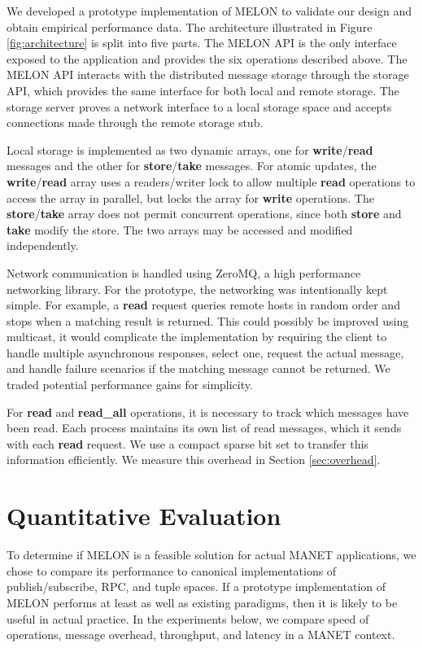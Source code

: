 \documentclass[lnicst]{svmultln}
\begin{document}
We developed a prototype implementation of MELON to validate our design and obtain empirical performance data. The architecture illustrated in Figure \ref{fig:architecture} is split into five parts. The MELON API is the only interface exposed to the application and provides the six operations described above. The MELON API interacts with the distributed message storage through the storage API, which provides the same interface for both local and remote storage. The storage server proves a network interface to a local storage space and accepts connections made through the remote storage stub.

Local storage is implemented as two dynamic arrays, one for \textbf{write}/\textbf{read} messages and the other for \textbf{store}/\textbf{take} messages. For atomic updates, the \textbf{write}/\textbf{read} array uses a readers/writer lock to allow multiple \textbf{read} operations to access the array in parallel, but locks the array for \textbf{write} operations. The \textbf{store}/\textbf{take} array does not permit concurrent operations, since both \textbf{store} and \textbf{take} modify the store. The two arrays may be accessed and modified independently.

Network communication is handled using ZeroMQ\cite{hintjens2013zeromq}, a high performance networking library. For the prototype, the networking was intentionally kept simple. For example, a \textbf{read} request queries remote hosts in random order and stops when a matching result is returned. This could possibly be improved using multicast, it would complicate the implementation by requiring the client to handle multiple asynchronous responses, select one, request the actual message, and handle failure scenarios if the matching message cannot be returned. We traded potential performance gains for simplicity. 

For \textbf{read} and \textbf{read\_all} operations, it is necessary to track which messages have been read. Each process maintains its own list of read messages, which it sends with each \textbf{read} request. We use a compact sparse bit set to transfer this information efficiently. We measure this overhead in Section \ref{sec:overhead}.

\section{Quantitative Evaluation}\label{sec:evaluation}

To determine if MELON is a feasible solution for actual MANET applications, we chose to compare its performance to canonical implementations of publish/subscribe, RPC, and tuple spaces. If a prototype implementation of MELON performs at least as well as existing paradigms, then it is likely to be useful in actual practice. In the experiments below, we compare speed of operations, message overhead, throughput, and latency in a MANET context.
\end{document}
